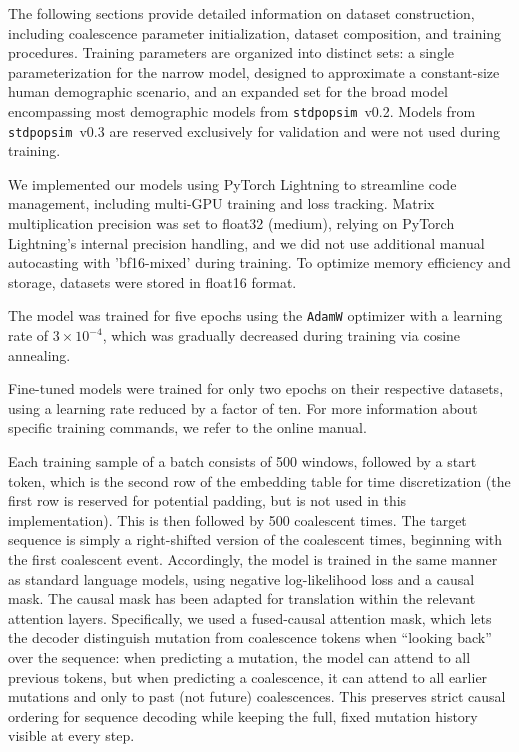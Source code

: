 \documentclass{article}
\newcommand{\stdpopsim}{\texttt{stdpopsim}\xspace}
\begin{document}
The following sections provide detailed information on dataset construction, including coalescence parameter initialization, dataset composition, and training procedures. 
Training parameters are organized into distinct sets: a single parameterization for the narrow model, designed to approximate a constant-size human demographic scenario, and an expanded set for the broad model encompassing most demographic models from \stdpopsim\ v0.2. 
Models from \stdpopsim\ v0.3 are reserved exclusively for validation and were not used during training.


We implemented our models using PyTorch Lightning to streamline code management,
including multi-GPU training and loss tracking. 
Matrix multiplication precision was set to float32 (medium), 
relying on PyTorch Lightning's internal precision handling, 
and we did not use additional manual autocasting with 'bf16-mixed' during training. 
To optimize memory efficiency and storage, datasets were stored in float16 format.

The model was trained for five epochs using the \texttt{AdamW} optimizer with a learning rate of $3\times10^{-4}$,
which was gradually decreased during training via cosine annealing.

Fine-tuned models were trained for only two epochs on their respective datasets, using a learning rate reduced by a factor of ten. For more information about specific training commands, we refer to the online manual.

Each training sample of a batch consists of 500 windows, followed by a start token, 
which is the second row of the embedding table for time discretization 
(the first row is reserved for potential padding, but is not used in this implementation).
This is then followed by 500 coalescent times. The target sequence is simply a right-shifted version of the coalescent times, beginning with the first coalescent event.
Accordingly, the model is trained in the same manner as standard language models, using negative log-likelihood loss and a causal mask. The causal mask has been adapted for translation within the relevant attention layers. Specifically, we used a fused-causal attention mask, which lets the decoder distinguish mutation from coalescence tokens when “looking back” over the sequence: when predicting a mutation, the model can attend to all previous tokens, but when predicting a coalescence, it can attend to all earlier mutations and only to past (not future) coalescences. This preserves strict causal ordering for sequence decoding while keeping the full, fixed mutation history visible at every step.
\end{document}
